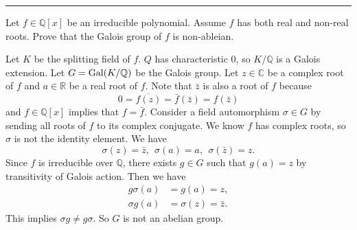 \documentclass[letterpaper, 12pt]{article}
\begin{document}
\noindent\rule{7in}{2.8pt}
\begin{problem}{2}
Let \(f\in \mathbb{Q}[x]\) be an irreducible polynomial. Assume \(f\) has both real and non-real roots. Prove that the Galois group of \(f\) is non-ableian.
\end{problem}
\begin{solution}
Let \(K\) be the splitting field of \(f\). \(Q\) has characteristic 0, so \(K/\mathbb{Q}\) is a Galois extension. Let \(G=\text{Gal}(K/\mathbb{Q})\) be the Galois group. Let \(z\in \mathbb{C}\) be a complex root of \(f\) and \(a\in \mathbb{R}\) be a real root of \(f\). Note that \(\bar{z}\) is also a root of \(f\) because 
\[0=\overline{f(z)}=\bar{f}(\bar{z})=f(\bar{z})\]
and \(f\in \mathbb{Q}[x]\) implies that \(f=\bar{f}\). Consider a field automorphism \(\sigma\in G\) by sending all roots of \(f\) to its complex conjugate. We know \(f\) has complex roots, so \(\sigma\) is not the identity element. We have  
\[\sigma(z)=\bar{z},\ \ \sigma(a)=a,\ \ \sigma(\bar{z})=z.\]
Since \(f\) is irreducible over \(\mathbb{Q}\), there exists \(g\in G\) such that \(g(a)=z\) by transitivity of Galois action. Then we have 
\begin{align*}
    g\sigma(a)&=g(a)=z,\\ 
    \sigma g(a)&=\sigma(z)=\bar{z}.
\end{align*}
This implies \(\sigma g\neq g\sigma\). So \(G\) is not an abelian group. 
\end{solution}
\end{document}
